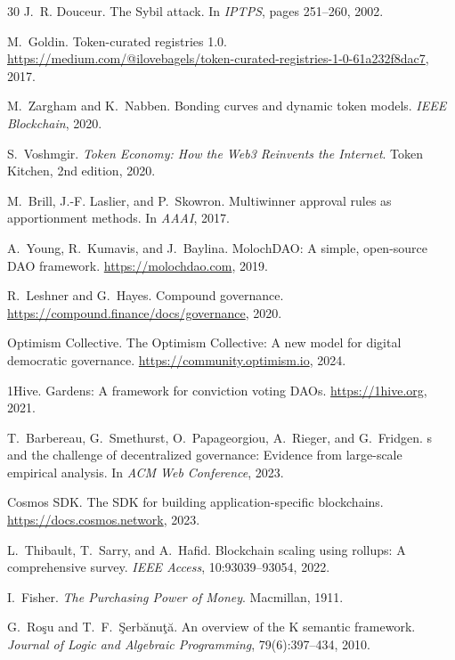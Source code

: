 \documentclass{article}
\begin{document}
\begin{thebibliography}{30}
J.~R. Douceur.
\newblock The {S}ybil attack.
\newblock In \emph{IPTPS}, pages 251--260, 2002.

M.~Goldin.
\newblock Token-curated registries 1.0.
\newblock \url{https://medium.com/@ilovebagels/token-curated-registries-1-0-61a232f8dac7}, 2017.

M.~Zargham and K.~Nabben.
\newblock Bonding curves and dynamic token models.
\newblock \emph{IEEE Blockchain}, 2020.

S.~Voshmgir.
\newblock \emph{Token Economy: How the {W}eb3 Reinvents the Internet}.
\newblock Token Kitchen, 2nd edition, 2020.

M.~Brill, J.-F. Laslier, and P.~Skowron.
\newblock Multiwinner approval rules as apportionment methods.
\newblock In \emph{AAAI}, 2017.

A.~Young, R.~Kumavis, and J.~Baylina.
\newblock Moloch{DAO}: A simple, open-source {DAO} framework.
\newblock \url{https://molochdao.com}, 2019.

R.~Leshner and G.~Hayes.
\newblock Compound governance.
\newblock \url{https://compound.finance/docs/governance}, 2020.

Optimism Collective.
\newblock The Optimism Collective: A new model for digital democratic governance.
\newblock \url{https://community.optimism.io}, 2024.

1Hive.
\newblock Gardens: A framework for conviction voting {DAO}s.
\newblock \url{https://1hive.org}, 2021.

T.~Barbereau, G.~Smethurst, O.~Papageorgiou, A.~Rieger, and G.~Fridgen.
s and the challenge of decentralized governance: Evidence from large-scale empirical analysis.
\newblock In \emph{ACM Web Conference}, 2023.

Cosmos SDK.
\newblock The {SDK} for building application-specific blockchains.
\newblock \url{https://docs.cosmos.network}, 2023.

L.~Thibault, T.~Sarry, and A.~Hafid.
\newblock Blockchain scaling using rollups: A comprehensive survey.
\newblock \emph{IEEE Access}, 10:93039--93054, 2022.

I.~Fisher.
\newblock \emph{The Purchasing Power of Money}.
\newblock Macmillan, 1911.

G.~Ro\c{s}u and T.~F.~\c{S}erb\u{a}nu\c{t}\u{a}.
\newblock An overview of the {K} semantic framework.
\newblock \emph{Journal of Logic and Algebraic Programming}, 79(6):397--434, 2010.

\end{thebibliography}
\end{document}
